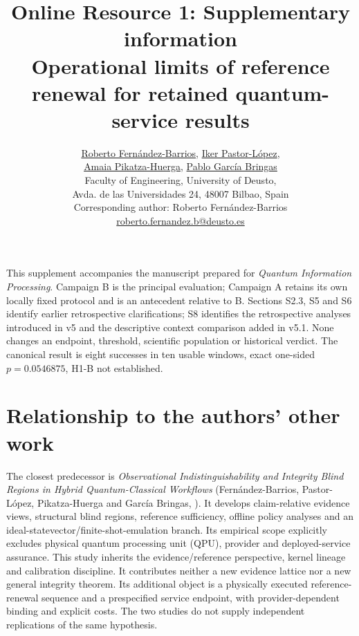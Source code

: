 \documentclass[11pt,a4paper]{article}
\title{Online Resource 1: Supplementary information\\Operational limits of reference renewal for retained quantum-service results}
\author{\begin{tabular}{c}
\normalsize \href{https://orcid.org/0009-0003-5312-2634}{Roberto Fernández-Barrios}, \href{https://orcid.org/0000-0002-3068-6248}{Iker Pastor-López},\\
\normalsize \href{https://orcid.org/0009-0003-9080-6242}{Amaia Pikatza-Huerga}, \href{https://orcid.org/0000-0003-3594-9534}{Pablo García Bringas}\\[5pt]
\small Faculty of Engineering, University of Deusto,\\
\small Avda. de las Universidades 24, 48007 Bilbao, Spain\\[4pt]
\small Corresponding author: Roberto Fernández-Barrios\\
\small \href{mailto:roberto.fernandez.b@deusto.es}{roberto.fernandez.b@deusto.es}
\end{tabular}}
{}\date{}
\begin{document}
\maketitle
\noindent This supplement accompanies the manuscript prepared for \emph{Quantum Information Processing}. Campaign B is the principal evaluation; Campaign A retains its own locally fixed protocol and is an antecedent relative to B. Sections S2.3, S5 and S6 identify earlier retrospective clarifications; S8 identifies the retrospective analyses introduced in v5 and the descriptive context comparison added in v5.1. None changes an endpoint, threshold, scientific population or historical verdict. The canonical result is eight successes in ten usable windows, exact one-sided $p=0.0546875$, H1-B not established.

\section{Relationship to the authors' other work}
The closest predecessor is \emph{Observational Indistinguishability and Integrity Blind Regions in Hybrid Quantum-Classical Workflows} (Fernández-Barrios, Pastor-López, Pikatza-Huerga and García Bringas, \cite{fernandez2026observational}). It develops claim-relative evidence views, structural blind regions, reference sufficiency, offline policy analyses and an ideal-statevector/finite-shot-emulation branch. Its empirical scope explicitly excludes physical quantum processing unit (QPU), provider and deployed-service assurance. This study inherits the evidence/reference perspective, kernel lineage and calibration discipline. It contributes neither a new evidence lattice nor a new general integrity theorem. Its additional object is a physically executed reference-renewal sequence and a prespecified service endpoint, with provider-dependent binding and explicit costs. The two studies do not supply independent replications of the same hypothesis.
\end{document}
